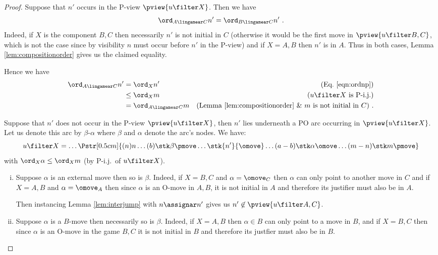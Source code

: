 \begin{proof}

Suppose that $n'$ occurs in the P-view $\pview{u\filter X}$. Then we have
\begin{equation}
\ord_{A\lingamear C} n'  = \ord_{B\lingamear C} n' \ . \label{eqn:ordnp}
\end{equation}
Indeed, if $X$ is the component $B,C$ then necessarily $n'$ is not initial in $C$ (otherwise it would be the first move in $\pview{u \filter B,C}$, which is not the case since by visibility $n$ must occur before $n'$ in the P-view) and
if $X=A,B$ then $n'$ is in $A$. Thus in both cases, Lemma \ref{lem:compositionorder} gives us the claimed equality.

Hence we have
\begin{align*}
\ord_{A\lingamear C} n'
& = \ord_{X} n' & \mbox{(Eq.\
\ref{eqn:ordnp})} \\
& \leq \ord_{X} m & \mbox{($u\filter X$ is P-i.j.)} \\
& = \ord_{A\lingamear C} m & \mbox{(Lemma \ref{lem:compositionorder} \& $m$ is not initial in $C$)} \ .
\end{align*}

Suppose that $n'$ does not occur in the P-view $\pview{u \filter X}$, then $n'$ lies underneath a PO arc occurring in $\pview{u \filter X}$. Let us denote this arc by $\beta$-$\alpha$ where $\beta$ and $\alpha$ denote the arc's nodes. We have:
$$ u \filter X = \ldots
\Pstr[0.5cm]{
 (n){n} \ldots (b){\stk\beta \pmove} \ldots \stk{n'} {\omove}
\ldots (a-b){\stk\alpha \omove}  \ldots (m-n){\stk m {\pmove} }
} $$
with $\ord_X \alpha \leq \ord_X m$ (by P-i.j.\ of $u \filter X$).

\begin{enumerate}[i.]
\item Suppose $\alpha$ is an external move then so is $\beta$. Indeed, if $X=B,C$ and $\alpha = \omove_C$ then $\alpha$ can only point to another move in $C$ and
if $X=A,B$ and $\alpha = \omove_A$ then since $\alpha$ is an O-move in $A,B$, it is not initial in $A$ and therefore its justifier must also be in $A$.

Then instancing Lemma \ref{lem:interjump} with
$n \assignar n'$ gives us $n' \not\in\pview{u \filter A,C}$.

\item Suppose $\alpha$ is a $B$-move then necessarily so is $\beta$. Indeed, if $X=A,B$ then $\alpha \in B$
can only point to a move in $B$, and if $X=B,C$ then
since $\alpha$ is an O-move in the game $B,C$ it is not initial in $B$ and therefore its justfier must also be in $B$.


\end{enumerate}
\end{proof}
